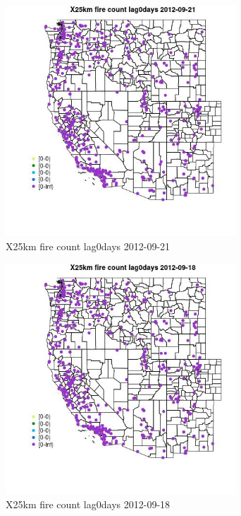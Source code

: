 \begin{figure} 
\centering  
\includegraphics[width=0.77\textwidth]{Code_Outputs/Report_ML_input_PM25_Step4_part_e_de_duplicated_aves_compiled_2019-05-14wNAs_MapObsX25km_fire_count_lag0days2012-09-21.jpg} 
\caption{\label{fig:Report_ML_input_PM25_Step4_part_e_de_duplicated_aves_compiled_2019-05-14wNAsMapObsX25km_fire_count_lag0days2012-09-21}X25km fire count lag0days 2012-09-21} 
\end{figure} 
 

\begin{figure} 
\centering  
\includegraphics[width=0.77\textwidth]{Code_Outputs/Report_ML_input_PM25_Step4_part_e_de_duplicated_aves_compiled_2019-05-14wNAs_MapObsX25km_fire_count_lag0days2012-09-18.jpg} 
\caption{\label{fig:Report_ML_input_PM25_Step4_part_e_de_duplicated_aves_compiled_2019-05-14wNAsMapObsX25km_fire_count_lag0days2012-09-18}X25km fire count lag0days 2012-09-18} 
\end{figure} 
 

